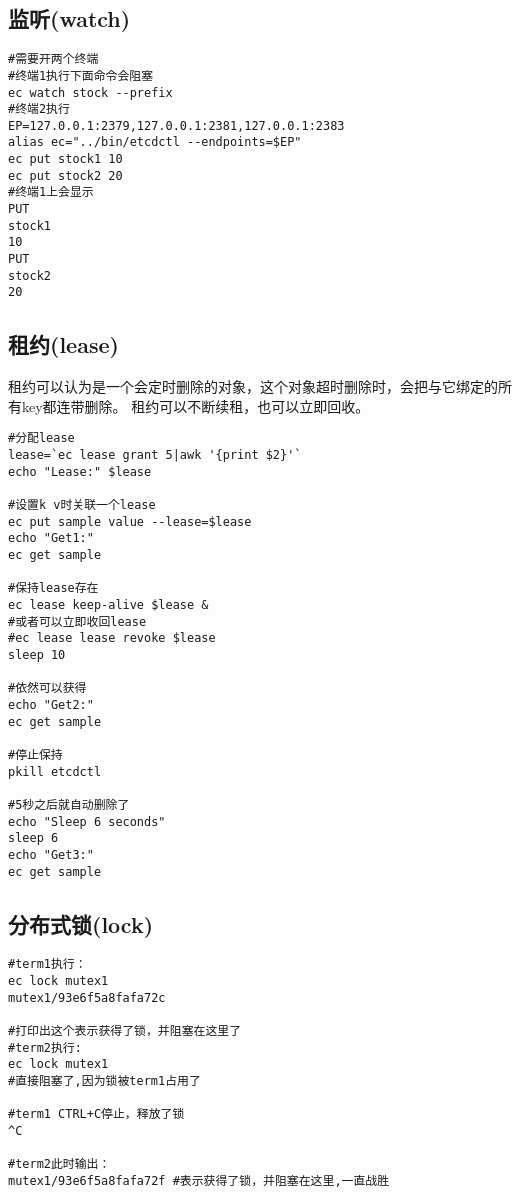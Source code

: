 \subsection{监听(watch)}
\begin{verbatim}
#需要开两个终端
#终端1执行下面命令会阻塞
ec watch stock --prefix
#终端2执行
EP=127.0.0.1:2379,127.0.0.1:2381,127.0.0.1:2383
alias ec="../bin/etcdctl --endpoints=$EP"
ec put stock1 10
ec put stock2 20
#终端1上会显示
PUT
stock1
10
PUT
stock2
20
\end{verbatim}

\subsection{租约(lease)}
租约可以认为是一个会定时删除的对象，这个对象超时删除时，会把与它绑定的所有key都连带删除。
租约可以不断续租，也可以立即回收。
\begin{verbatim}
#分配lease
lease=`ec lease grant 5|awk '{print $2}'`
echo "Lease:" $lease

#设置k v时关联一个lease
ec put sample value --lease=$lease
echo "Get1:"
ec get sample

#保持lease存在
ec lease keep-alive $lease & 
#或者可以立即收回lease
#ec lease lease revoke $lease
sleep 10

#依然可以获得
echo "Get2:"
ec get sample

#停止保持
pkill etcdctl

#5秒之后就自动删除了
echo "Sleep 6 seconds"
sleep 6
echo "Get3:"
ec get sample
\end{verbatim}


\subsection{分布式锁(lock)}
\begin{verbatim}
#term1执行：
ec lock mutex1
mutex1/93e6f5a8fafa72c

#打印出这个表示获得了锁，并阻塞在这里了
#term2执行:
ec lock mutex1
#直接阻塞了,因为锁被term1占用了

#term1 CTRL+C停止，释放了锁
^C

#term2此时输出：
mutex1/93e6f5a8fafa72f #表示获得了锁，并阻塞在这里,一直战胜
\end{verbatim}

